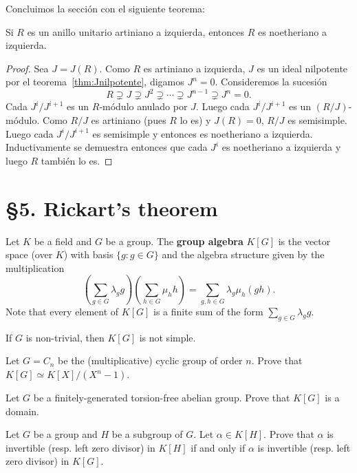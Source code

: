 Concluimos la sección con el siguiente teorema:

\begin{theorem}
	\label{thm:Hopkins-Levitski}
	Si $R$ es un anillo unitario artiniano a izquierda, entonces $R$ es
	noetheriano a izquierda.
\end{theorem}

\begin{proof}
	Sea $J=J(R)$. Como $R$ es artiniano a izquierda, $J$ es un ideal nilpotente
	por el teorema~\ref{thm:Jnilpotente}, digamos $J^n=0$. Consideremos la
	sucesión
	\[
		R\supsetneq J\supsetneq J^2\supsetneq\cdots\supsetneq J^{n-1}\supsetneq J^n=0.
	\]
	Cada $J^{i}/J^{i+1}$ es un $R$-módulo anulado por $J$. Luego cada 
	$J^i/J^{i+1}$ es un $(R/J)$-módulo. Como $R/J$ es artiniano (pues $R$ lo
	es) y $J(R)=0$, $R/J$ es semisimple. Luego cada $J^{i}/J^{i+1}$ es
	semisimple y entonces es noetheriano a izquierda.  Inductivamente se
	demuestra entonces que cada $J^i$ es noetheriano a izquierda y luego $R$
	también lo es.
\end{proof}


\section*{\S5. Rickart's theorem}

Let $K$ be a field and $G$ be a group. The \textbf{group algebra} $K[G]$ 
is the vector space (over $K$) with basis $\{g:g\in G\}$ 
and the algebra structure given by the multiplication
\[
	\left(\sum_{g\in G}\lambda_gg\right)\left(\sum_{h\in G}\mu_hh\right)
	=\sum_{g,h\in G}\lambda_g\mu_h(gh).
\]
Note that every element of $K[G]$ is a finite sum of the form $\sum_{g\in G}\lambda_gg$.

\begin{exercise}
\label{xc:K[G]notsimple}
    If $G$ is non-trivial, then $K[G]$ is not simple. 
\end{exercise}

\begin{exercise}
	Let $G=C_n$ be the (multiplicative) cyclic group of order $n$. Prove that 
	$K[G]\simeq K[X]/(X^n-1)$. 
\end{exercise}

\begin{exercise}
	Let $G$ be a finitely-generated torsion-free abelian group. Prove that 
	$K[G]$ is a domain. 
\end{exercise}

\begin{exercise}
	Let $G$ be a group and $H$ be a subgroup of $G$. Let $\alpha\in K[H]$. Prove that 
    $\alpha$ is invertible (resp. left zero divisor) in $K[H]$ if and only if 
	$\alpha$ is invertible (resp. left zero divisor) in
	$K[G]$.
\end{exercise}

